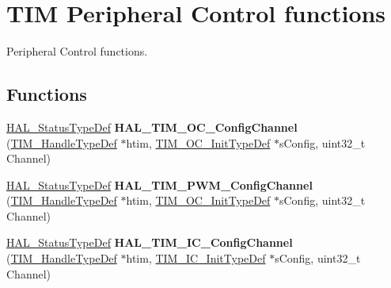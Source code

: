 \hypertarget{group___t_i_m___exported___functions___group8}{}\section{T\+IM Peripheral Control functions}
\label{group___t_i_m___exported___functions___group8}


Peripheral Control functions.  


\subsection*{Functions}
\begin{DoxyCompactItemize}
\item 
\mbox{\label{group___t_i_m___exported___functions___group8_ga6e22dfc93b7569da087a115348c3182f}} 
\hyperlink{stm32f4xx__hal__def_8h_a63c0679d1cb8b8c684fbb0632743478f}{H\+A\+L\+\_\+\+Status\+Type\+Def} {\bfseries H\+A\+L\+\_\+\+T\+I\+M\+\_\+\+O\+C\+\_\+\+Config\+Channel} (\hyperlink{struct_t_i_m___handle_type_def}{T\+I\+M\+\_\+\+Handle\+Type\+Def} $\ast$htim, \hyperlink{struct_t_i_m___o_c___init_type_def}{T\+I\+M\+\_\+\+O\+C\+\_\+\+Init\+Type\+Def} $\ast$s\+Config, uint32\+\_\+t Channel)
\item 
\mbox{\label{group___t_i_m___exported___functions___group8_gac14a4959f65f51a54e8ff511242e2131}} 
\hyperlink{stm32f4xx__hal__def_8h_a63c0679d1cb8b8c684fbb0632743478f}{H\+A\+L\+\_\+\+Status\+Type\+Def} {\bfseries H\+A\+L\+\_\+\+T\+I\+M\+\_\+\+P\+W\+M\+\_\+\+Config\+Channel} (\hyperlink{struct_t_i_m___handle_type_def}{T\+I\+M\+\_\+\+Handle\+Type\+Def} $\ast$htim, \hyperlink{struct_t_i_m___o_c___init_type_def}{T\+I\+M\+\_\+\+O\+C\+\_\+\+Init\+Type\+Def} $\ast$s\+Config, uint32\+\_\+t Channel)
\item 
\mbox{\label{group___t_i_m___exported___functions___group8_ga34805dabaf748c6eb823275dad2f19f5}} 
\hyperlink{stm32f4xx__hal__def_8h_a63c0679d1cb8b8c684fbb0632743478f}{H\+A\+L\+\_\+\+Status\+Type\+Def} {\bfseries H\+A\+L\+\_\+\+T\+I\+M\+\_\+\+I\+C\+\_\+\+Config\+Channel} (\hyperlink{struct_t_i_m___handle_type_def}{T\+I\+M\+\_\+\+Handle\+Type\+Def} $\ast$htim, \hyperlink{struct_t_i_m___i_c___init_type_def}{T\+I\+M\+\_\+\+I\+C\+\_\+\+Init\+Type\+Def} $\ast$s\+Config, uint32\+\_\+t Channel)

\end{DoxyCompactItemize}
